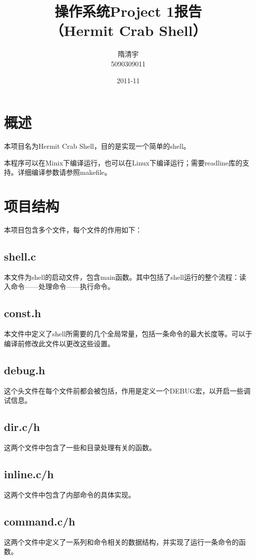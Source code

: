 \documentclass{article}
\title{\textbf{操作系统Project 1报告}\\（Hermit Crab Shell）}
\author{隋清宇\\5090309011}
\date{2011-11}
\begin{document}
\maketitle
\thispagestyle{empty}
\newpage

\tableofcontents
\thispagestyle{empty}
\newpage

\setcounter{page}{1}
\section{概述}
本项目名为Hermit Crab Shell，目的是实现一个简单的shell。

本程序可以在Minix下编译运行，也可以在Linux下编译运行；需要readline库的支持。详细编译参数请参照makefile。

\section{项目结构}
本项目包含多个文件，每个文件的作用如下：

\subsection{shell.c}
本文件为shell的启动文件，包含main函数。其中包括了shell运行的整个流程：读入命令——处理命令——执行命令。

\subsection{const.h}
本文件中定义了shell所需要的几个全局常量，包括一条命令的最大长度等。可以于编译前修改此文件以更改这些设置。

\subsection{debug.h}
这个头文件在每个文件前都会被包括，作用是定义一个DEBUG宏，以开启一些调试信息。

\subsection{dir.c/h}
这两个文件中包含了一些和目录处理有关的函数。

\subsection{inline.c/h}
这两个文件中包含了内部命令的具体实现。

\subsection{command.c/h}
这两个文件中定义了一系列和命令相关的数据结构，并实现了运行一条命令的函数。
\end{document}
